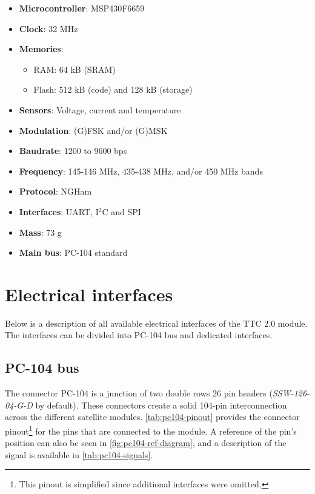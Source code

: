 \begin{itemize}
    \item \textbf{Microcontroller}: MSP430F6659
    \item \textbf{Clock}: 32 MHz
    \item \textbf{Memories}:
    \begin{itemize}
        \item RAM: 64 kB (SRAM)
        \item Flash: 512 kB (code) and 128 kB (storage)
    \end{itemize}
    \item \textbf{Sensors}: Voltage, current and temperature
    \item \textbf{Modulation}: (G)FSK and/or (G)MSK
    \item \textbf{Baudrate}: 1200 to 9600 bps
    \item \textbf{Frequency}: 145-146 MHz, 435-438 MHz, and/or 450 MHz bands
    \item \textbf{Protocol}: NGHam
    \item \textbf{Interfaces}: UART, I$^{2}$C and SPI
    \item \textbf{Mass}: 73 g
    \item \textbf{Main bus}: PC-104 standard
\end{itemize}

\section{Electrical interfaces}

Below is a description of all available electrical interfaces of the TTC 2.0 module. The interfaces can be divided into PC-104 bus and dedicated interfaces.

\subsection{PC-104 bus}

The connector PC-104 is a junction of two double rows 26 pin headers (\textit{SSW-126-04-G-D} by default). These connectors create a solid 104-pin interconnection across the different satellite modules. \autoref{tab:pc104-pinout} provides the connector pinout\footnote{This pinout is simplified since additional interfaces were omitted.} for the pins that are connected to the module. A reference of the pin's position can also be seen in \autoref{fig:pc104-ref-diagram}, and a description of the signal is available in \autoref{tab:pc104-signals}.

